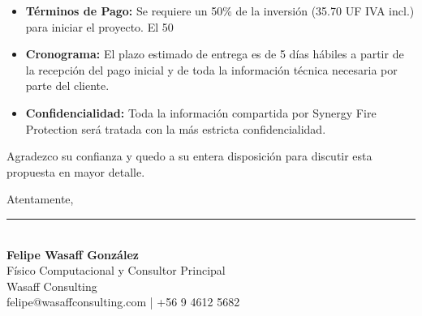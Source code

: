 \documentclass[a4paper,12pt]{article}
\begin{document}
\begin{itemize}[leftmargin=*, label=\textbullet]
    \item \textbf{Términos de Pago:} Se requiere un 50\% de la inversión (35.70 UF IVA incl.) para iniciar el proyecto. El 50%
    \item \textbf{Cronograma:} El plazo estimado de entrega es de 5 días hábiles a partir de la recepción del pago inicial y de toda la información técnica necesaria por parte del cliente.
    \item \textbf{Confidencialidad:} Toda la información compartida por Synergy Fire Protection será tratada con la más estricta confidencialidad.
\end{itemize}

\vfill 

Agradezco su confianza y quedo a su entera disposición para discutir esta propuesta en mayor detalle.

Atentamente,
\vspace{1.5cm}

\noindent\rule{7cm}{0.4pt}\\
\textbf{Felipe Wasaff González}\\
Físico Computacional y Consultor Principal\\
Wasaff Consulting\\
felipe@wasaffconsulting.com | +56 9 4612 5682
\end{document}
